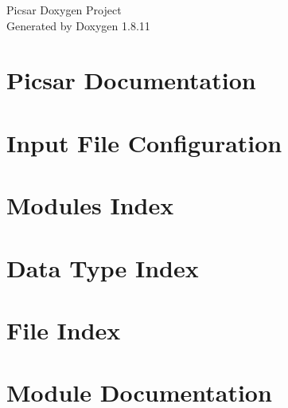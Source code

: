\documentclass[twoside]{book}
\newcommand{\+}{\discretionary{\mbox{\scriptsize$\hookleftarrow$}}{}{}}
\newcommand{\clearemptydoublepage}{%
  \newpage{\pagestyle{empty}\cleardoublepage}%
}
\begin{document}
\hypersetup{pageanchor=false,
             bookmarksnumbered=true,
             pdfencoding=unicode
            }
\begin{titlepage}
\vspace*{7cm}
\begin{center}%
{\Large Picsar Doxygen Project }\\
\vspace*{1cm}
{\large Generated by Doxygen 1.8.11}\\
\end{center}
\end{titlepage}
\clearemptydoublepage
\tableofcontents
\clearemptydoublepage
{}
\hypersetup{pageanchor=true}

\chapter{Picsar Documentation}
\label{index}\hypertarget{index}{}
\chapter{Input File Configuration}
\label{Input File Configuration}
\hypertarget{Input File Configuration}{}

\chapter{Modules Index}

\chapter{Data Type Index}

\chapter{File Index}

\chapter{Module Documentation}































\end{document}
